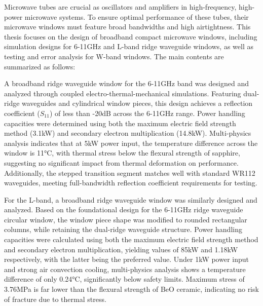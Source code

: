 \documentclass[master]{thesis-uestc}
\begin{document}
\begin{englishabstract}
 Microwave tubes are crucial as oscillators and amplifiers in high-frequency, high-power microwave systems. To ensure optimal performance of these tubes, their microwave windows must feature broad bandwidths and high airtightness. This thesis focuses on the design of broadband compact microwave windows, including simulation designs for 6-11GHz and L-band ridge waveguide windows, as well as testing and error analysis for W-band windows. The main contents are summarized as follows:

A broadband ridge waveguide window for the 6-11GHz band was designed and analyzed through coupled electro-thermal-mechanical simulations. Featuring dual-ridge waveguides and cylindrical window pieces, this design achieves a reflection coefficient (\(S_{11}\)) of less than -20dB across the 6-11GHz range. Power handling capacities were determined using both the maximum electric field strength method (3.1kW) and secondary electron multiplication (14.8kW). Multi-physics analysis indicates that at 5kW power input, the temperature difference across the window is 11°C, with thermal stress below the flexural strength of sapphire, suggesting no significant impact from thermal deformation on performance. Additionally, the stepped transition segment matches well with standard WR112 waveguides, meeting full-bandwidth reflection coefficient requirements for testing.

 For the L-band, a broadband ridge waveguide window was similarly designed and analyzed. Based on the foundational design for the 6-11GHz ridge waveguide circular window, the window piece shape was modified to rounded rectangular columns, while retaining the dual-ridge waveguide structure. Power handling capacities were calculated using both the maximum electric field strength method and secondary electron multiplication, yielding values of 85kW and 1.18kW respectively, with the latter being the preferred value. Under 1kW power input and strong air convection cooling, multi-physics analysis shows a temperature difference of only 0.24°C, significantly below safety limits. Maximum stress of 3.76MPa is far lower than the flexural strength of BeO ceramic, indicating no risk of fracture due to thermal stress.


\end{englishabstract}
\end{document}
